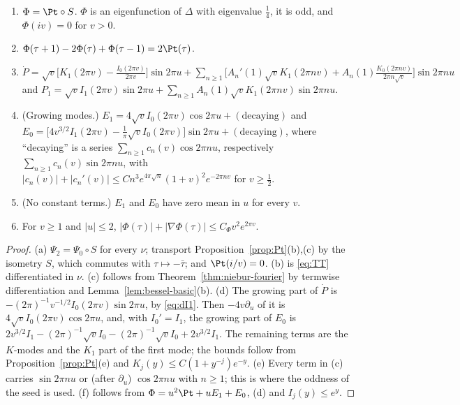 \begin{proposition}\label{prop:sym2}
\begin{enumerate}[label=\textup{(\alph*)}]
\item $\Phi=\Pt\circ S$. $\Phi$ is an eigenfunction of $\Delta$ with eigenvalue $\frac14$, it is odd, and $\Phi(iv)=0$ for $v>0$.
\item $\Phi(\tau+1)-2\Phi(\tau)+\Phi(\tau-1)=2\Pt(\tau)$.
\item $\dot P=\sqrt v\big[K_1(2\pi v)-\frac{I_0(2\pi v)}{2\pi v}\big]\sin2\pi u+\sum_{n\ge1}\Big[A_n'(1)\sqrt vK_1(2\pi nv)+A_n(1)\frac{K_0(2\pi nv)}{2\pi n\sqrt v}\Big]\sin2\pi nu$
and $P_1=\sqrt vI_1(2\pi v)\sin2\pi u+\sum_{n\ge1}A_n(1)\sqrt vK_1(2\pi nv)\sin2\pi nu$.
\item (Growing modes.) $E_1=4\sqrt vI_0(2\pi v)\cos2\pi u+(\text{decaying})$ and
$E_0=\big[4v^{3/2}I_1(2\pi v)-\frac1\pi\sqrt vI_0(2\pi v)\big]\sin2\pi u+(\text{decaying})$, where ``decaying'' is a series
$\sum_{n\ge1}c_n(v)\cos2\pi nu$, respectively $\sum_{n\ge1}c_n(v)\sin2\pi nu$, with $|c_n(v)|+|c_n'(v)|\le Cn^3e^{4\pi\sqrt n}(1+v)^2e^{-2\pi nv}$ for $v\ge\frac12$.
\item (No constant terms.) $E_1$ and $E_0$ have zero mean in $u$ for every $v$.
\item For $v\ge1$ and $|u|\le2$, $|\Phi(\tau)|+|\nabla\Phi(\tau)|\le C_\Phi v^2e^{2\pi v}$.
\end{enumerate}
\end{proposition}

\begin{proof}
(a) $\Psi_2=\Psi_0\circ S$ for every $\nu$; transport Proposition~\ref{prop:Pt}(b),(c) by the isometry $S$, which commutes with
$\tau\mapsto-\bar\tau$; and $\Pt(i/v)=0$. (b) is \eqref{eq:TT} differentiated in $\nu$. (c) follows from Theorem~\ref{thm:niebur-fourier} by
termwise differentiation and Lemma~\ref{lem:bessel-basic}(b). (d) The growing part of $\dot P$ is $-(2\pi)^{-1}v^{-1/2}I_0(2\pi v)\sin2\pi u$, by
\eqref{eq:dI1}. Then $-4v\partial_u$ of it is $4\sqrt vI_0(2\pi v)\cos2\pi u$, and, with $I_0'=I_1$, the growing part of $E_0$ is
$2v^{3/2}I_1-(2\pi)^{-1}\sqrt vI_0-(2\pi)^{-1}\sqrt vI_0+2v^{3/2}I_1$. The remaining terms are the $K$-modes and the $K_1$ part of the first mode;
the bounds follow from Proposition~\ref{prop:Pt}(e) and $K_j(y)\le C(1+y^{-j})e^{-y}$. (e) Every term in (c) carries $\sin2\pi nu$ or (after
$\partial_u$) $\cos2\pi nu$ with $n\ge1$; this is where the oddness of the seed is used. (f) follows from $\Phi=u^2\Pt+uE_1+E_0$, (d) and
$I_j(y)\le e^y$.
\end{proof}

